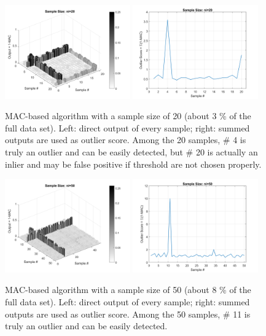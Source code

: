 \documentclass[12pt]{article}
\begin{document}
\begin{figure}[ht!]
\centering
\includegraphics[width=0.48\textwidth]{MAC_ni20}
\includegraphics[width=0.48\textwidth]{MACscore_ni20}
\caption{MAC-based algorithm with a sample size of 20 (about 3 \% of the full data set).
Left: direct output of every sample; right: summed outputs are used as outlier score.
Among the 20 samples, \# 4 is truly an outlier and can be easily detected,
but \# 20 is actually an inlier and may be false positive if threshold are not chosen properly.
}
\label{fig:fig7}
\end{figure}

\begin{figure}[ht!]
\centering
\includegraphics[width=0.48\textwidth]{MAC_ni50}
\includegraphics[width=0.48\textwidth]{MACscore_ni50}
\label{fig:fig8}
\caption{MAC-based algorithm with a sample size of 50 (about 8 \% of the full data set).
Left: direct output of every sample; right: summed outputs are used as outlier score.
Among the 50 samples, \# 11 is truly an outlier and can be easily detected.}
\end{figure}
\end{document}
